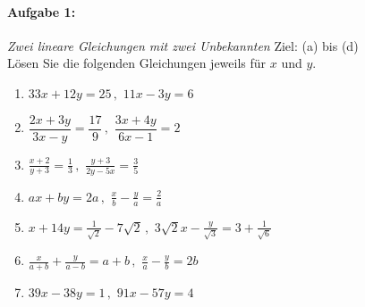 
\paragraph{Aufgabe 1: } \emph{Zwei lineare Gleichungen mit zwei Unbekannten} \hfill Ziel: (a) bis (d)\\[0.2cm]
Lösen Sie die folgenden Gleichungen jeweils für $x$ und $y$.
\begin{enumerate}[label=(\alph*)]
    \item $33x+12y=25\,,$ \tab $11x-3y=6$
    \item $\dfrac{2x+3y}{3x-y}=\dfrac{17}{9}\,, $ \tab $ \dfrac{3x+4y}{6x-1}=2$
    \item $\frac{x+2}{y+3}=\frac{1}{3}\,, $ \tab $ \frac{y+3}{2y-5x}=\frac{3}{5}$
    \item $ax+by=2a\,, $ \tab $ \frac{x}{b}-\frac{y}{a}=\frac{2}{a}$
    \item $x+14y=\frac{1}{\sqrt{2}}-7\sqrt{2}\,, $ \tab $ 3\sqrt{2}x-\frac{y}{\sqrt{3}}=3+\frac{1}{\sqrt{6}}$
    \item $\frac{x}{a+b}+\frac{y}{a-b}=a+b\,, $ \tab $ \frac{x}{a}-\frac{y}{b}=2b$
    \item $39x-38y=1\,, $ \tab $ 91x-57y=4$
\end{enumerate}

